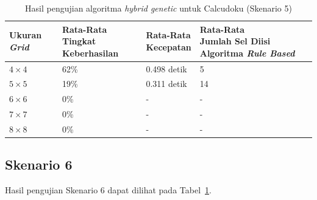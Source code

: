 \begin{table}
\centering
\captionsetup{justification=centering}
\caption[Hasil pengujian algoritma \textit{hybrid genetic} untuk Calcudoku (Skenario 5)]{Hasil pengujian algoritma \textit{hybrid genetic} untuk Calcudoku (Skenario 5)}
\begin{tabular}{| l | l | l | l |}
\hline
Ukuran \textit{Grid} & \makecell[l]{Rata-Rata \\ Tingkat Keberhasilan} & \makecell[l]{Rata-Rata \\ Kecepatan} & \makecell[l]{Rata-Rata \\ Jumlah Sel Diisi Algoritma \textit{Rule Based}} \\
\hline \hline
\begin{math}4 \times 4\end{math} & 62\% & 0.498 detik & 5 \\
\hline
\begin{math}5 \times 5\end{math} & 19\% & 0.311 detik & 14 \\
\hline
\begin{math}6 \times 6\end{math} & 0\% & - & - \\
\hline
\begin{math}7 \times 7\end{math} & 0\% & - & - \\
\hline
\begin{math}8 \times 8\end{math} & 0\% & - & - \\
\hline
\end{tabular}
\label{tab:pengujianhg5}
\end{table}

\subsection{Skenario 6}
\label{sec:skenario6}

Hasil pengujian Skenario 6 dapat dilihat pada Tabel~\ref{tab:pengujianhg5}.

